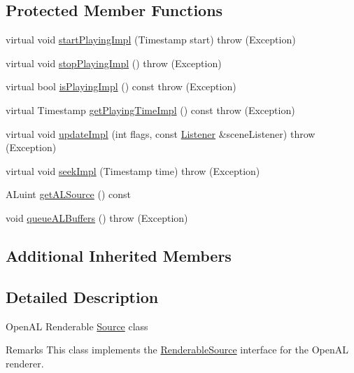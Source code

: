 \subsection*{Protected Member Functions}
\begin{DoxyCompactItemize}
\item 
virtual void \hyperlink{classAudio_1_1OpenALRenderableStreamingSource_ae36b0a35ef74abeeab14cf7fcf6229d9}{start\+Playing\+Impl} (Timestamp start)  throw (\+Exception)
\item 
virtual void \hyperlink{classAudio_1_1OpenALRenderableStreamingSource_ae8c70071bf8c602c52cfbada6ebefd10}{stop\+Playing\+Impl} ()  throw (\+Exception)
\item 
virtual bool \hyperlink{classAudio_1_1OpenALRenderableStreamingSource_aac8b7fe4f344431d68725a4d723a4f4b}{is\+Playing\+Impl} () const   throw (\+Exception)
\item 
virtual Timestamp \hyperlink{classAudio_1_1OpenALRenderableStreamingSource_ac887a3ca11f25abd42fa07086516d461}{get\+Playing\+Time\+Impl} () const   throw (\+Exception)
\item 
virtual void \hyperlink{classAudio_1_1OpenALRenderableStreamingSource_ac484b12b9e263efb396efbb40ea8bf77}{update\+Impl} (int flags, const \hyperlink{classAudio_1_1Listener}{Listener} \&scene\+Listener)  throw (\+Exception)
\item 
virtual void \hyperlink{classAudio_1_1OpenALRenderableStreamingSource_ad41ca876f277720b983309dc51cd17c5}{seek\+Impl} (Timestamp time)  throw (\+Exception)
\item 
A\+Luint \hyperlink{classAudio_1_1OpenALRenderableStreamingSource_a09174b0d9f46c5c02d5ed62c5dee2b35}{get\+A\+L\+Source} () const 
\item 
void \hyperlink{classAudio_1_1OpenALRenderableStreamingSource_aee3a50bc65b04822fa8470a8f7c0bfc0}{queue\+A\+L\+Buffers} ()  throw (\+Exception)
\end{DoxyCompactItemize}
\subsection*{Additional Inherited Members}


\subsection{Detailed Description}
Open\+AL Renderable \hyperlink{classAudio_1_1Source}{Source} class

\begin{DoxyRemark}{Remarks}
This class implements the \hyperlink{classAudio_1_1RenderableSource}{Renderable\+Source} interface for the Open\+AL renderer. 
\end{DoxyRemark}


